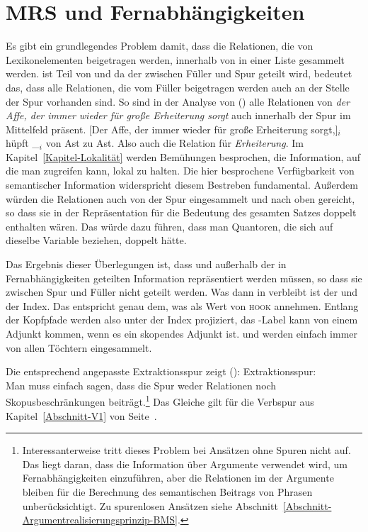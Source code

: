 \section{MRS und Fernabhängigkeiten}
\label{Abschnitt MRS und Fernabhängigkeiten}

Es gibt ein grundlegendes Problem damit, dass die Relationen, die von Lexikonelementen beigetragen
werden, innerhalb von \cont in einer Liste gesammelt werden. \cont ist Teil von \local und da der
\localw zwischen Füller und Spur geteilt wird, bedeutet das, dass alle Relationen, die vom Füller
beigetragen werden auch an der Stelle der Spur vorhanden sind. So sind in der Analyse von ()
alle Relationen von \emph{der Affe, der immer wieder für große Erheiterung sorgt} auch innerhalb der
Spur im Mittelfeld präsent.
\ea
{}[Der Affe, der immer wieder für große Erheiterung sorgt,]$_i$ hüpft \_$_i$ von Ast zu Ast.
\z
Also auch die Relation für \emph{Erheiterung}. Im Kapitel~\ref{Kapitel-Lokalität} werden Bemühungen
besprochen, die Information, auf die man zugreifen kann, lokal zu halten. Die hier besprochene
Verfügbarkeit von semantischer Information widerspricht diesem Bestreben fundamental. Außerdem
würden die Relationen auch von der Spur eingesammelt und nach oben gereicht, so dass sie in der
Repräsentation für die Bedeutung des gesamten Satzes doppelt enthalten wären. Das würde dazu führen,
dass man Quantoren, die sich auf dieselbe Variable beziehen, doppelt hätte.

Das Ergebnis dieser Überlegungen ist, dass \rels und \hcons außerhalb der in Fernabhängigkeiten
geteilten Information repräsentiert werden müssen, so dass sie zwischen Spur und Füller nicht
geteilt werden. Was dann in \cont verbleibt ist der \ltopw und der Index. Das entspricht genau dem,
was \citet[, 307]{CFPS2005a} als Wert von \textsc{hook} annehmen. Entlang der Kopfpfade
werden also unter \cont der Index projiziert, das \ltop\hyp Label kann von einem Adjunkt kommen,
wenn es ein skopendes Adjunkt ist. \rels und \hcons werden einfach immer von allen Töchtern eingesammelt.

Die entsprechend angepasste Extraktionsspur zeigt ():
\eas
\label{le-Extraktionsspur2}%
Extraktionsspur: \\
\zs
Man muss einfach sagen, dass die Spur weder Relationen noch Skopusbeschränkungen
beiträgt.\footnote{%
Interessanterweise tritt dieses Problem bei Ansätzen ohne Spuren nicht auf. Das liegt daran, dass
die Information über Argumente verwendet wird, um Fernabhängigkeiten einzuführen, aber die
Relationen im \contw der Argumente bleiben für die Berechnung des semantischen Beitrags von Phrasen
unberücksichtigt. Zu spurenlosen Ansätzen siehe Abschnitt~\ref{Abschnitt-Argumentrealisierungsprinzip-BMS}.}
Das Gleiche gilt für die Verbspur aus Kapitel~\ref{Abschnitt-V1} von Seite~\pageref{le-verbspur}.

